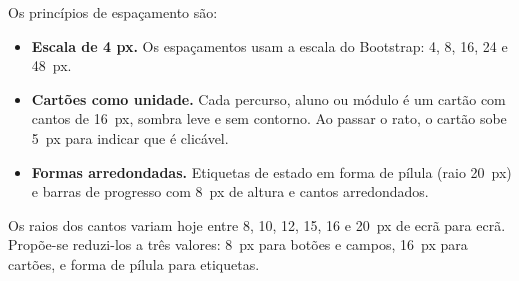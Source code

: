 Os princípios de espaçamento são:

\begin{itemize}
    \item \textbf{Escala de 4 px.} Os espaçamentos usam a escala do Bootstrap: 4, 8, 16, 24 e 48~px.
    \item \textbf{Cartões como unidade.} Cada percurso, aluno ou módulo é um cartão com cantos de 16~px, sombra leve e sem contorno. Ao passar o rato, o cartão sobe 5~px para indicar que é clicável.
    \item \textbf{Formas arredondadas.} Etiquetas de estado em forma de pílula (raio 20~px) e barras de progresso com 8~px de altura e cantos arredondados.
\end{itemize}

Os raios dos cantos variam hoje entre 8, 10, 12, 15, 16 e 20~px de ecrã para ecrã. Propõe-se reduzi-los a três valores: 8~px para botões e campos, 16~px para cartões, e forma de pílula para etiquetas.
